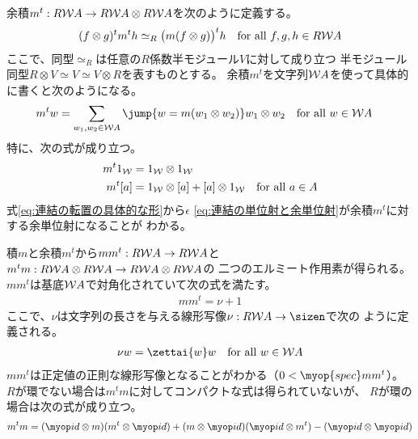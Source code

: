 	余積$m^t:R\mathcal{W}{A}\to R\mathcal{W}{A}\otimes R\mathcal{W}{A}$を次のように定義する。
	\begin{equation*}\begin{split} %
		(f\otimes g)^tm^th \simeq_R \bigl(m(f\otimes g)\bigr)^th
		\quad\text{for all }f,g,h\in R\Word{A}
	\end{split}\end{equation*} %
	ここで、同型$\simeq_R$は任意の$R$係数半モジュール$V$に対して成り立つ
	半モジュール同型$R\otimes V \simeq V\simeq V\otimes R$を表すものとする。
	余積$m^t$を文字列$\mathcal{W}{A}$を使って具体的に書くと次のようになる。
	\begin{equation}\label{eq:連結の転置の具体的な形}\begin{split} %
		m^tw &= \sum_{w_1,w_2\in \Word{A}}\jump{w=m(w_1\otimes w_2)}
			w_1\otimes w_2 \quad\text{for all }w\in \Word{A}
	\end{split}\end{equation} %
	特に、次の式が成り立つ。
	\begin{equation*}\begin{split} %
		m^t\wordu{} &= \wordu{}\otimes \wordu{} \\
		m^t\word{a} &= \wordu{}\otimes \word{a} + \word{a}\otimes \wordu{}
		\quad\text{for all }a\in A
	\end{split}\end{equation*} %
	式\eqref{eq:連結の転置の具体的な形}から$\epsilon$
	\eqref{eq:連結の単位射と余単位射}が余積$m^t$に対する余単位射になることが
	わかる。

	積$m$と余積$m^t$から$mm^t:R\mathcal{W}{A}\to R\mathcal{W}{A}$と
	$m^tm:R\mathcal{W}{A}\otimes R\mathcal{W}{A}\to R\mathcal{W}{A}\otimes R\mathcal{W}{A}$の
	二つのエルミート作用素が得られる。
	$mm^t$は基底$\mathcal{W}{A}$で対角化されていて次の式を満たす。
	\begin{equation}\label{eq:文字数作用素}\begin{split} %
		mm^t = \nu + 1
	\end{split}\end{equation} %
	ここで、$\nu$は文字列の長さを与える線形写像$\nu:R\Word{A}\to\sizen$で次の
	ように定義される。
	\begin{equation*}\begin{split} %
		\nu w = \zettai{w}w \quad\text{for all }w\in \Word{A}
	\end{split}\end{equation*} %
	$mm^t$は正定値の正則な線形写像となることがわかる（$0<\myop{spec}mm^t$）。
	$R$が環でない場合は$m^tm$に対してコンパクトな式は得られていないが、
	$R$が環の場合は次の式が成り立つ。
	\begin{equation}\label{eq:Brzozowski則}\begin{split} %
		m^tm = (\myid\otimes m)(m^t\otimes \myid)
			+ (m\otimes \myid)(\myid\otimes m^t)
			- (\myid\otimes \myid)
	\end{split}\end{equation} %

